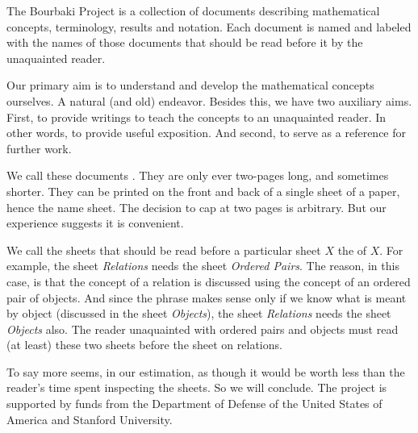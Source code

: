 
\sbasic

\sstart
{}

The Bourbaki Project is a collection
of documents describing mathematical
concepts, terminology, results and
notation. Each document is named and
labeled with the names of those documents
that should be read before it by the
unaquainted reader.

Our primary aim is to understand and
develop the mathematical concepts ourselves.
A natural (and old) endeavor.
Besides this, we have two auxiliary aims.
First, to provide writings to teach
the concepts to an unaquainted reader. In other
words, to provide useful exposition.
And second, to serve as a reference for
further work.

We call these documents .
They are only ever two-pages long, and
sometimes shorter.
They can be printed on the front
and back of a single
sheet of a paper, hence the name sheet.
The decision to cap at two pages is
arbitrary.
But our
experience suggests it is convenient.

We call the sheets that should
be read before a particular sheet
$X$ the  of $X$.
For example, the sheet \textit{Relations}
needs the sheet \textit{Ordered Pairs}.
The reason, in this case, is that the
concept of a relation is discussed using
the concept of an ordered pair of objects.
And since the phrase
 makes sense
only if we know what is meant by object
(discussed in the sheet \textit{Objects}),
the sheet \textit{Relations} needs the sheet
\textit{Objects} also.
The reader unaquainted with
ordered pairs and
objects must read (at least) these two
sheets before the sheet on relations.



%
%


To say more seems, in our
estimation, as though it would be
worth less than the reader's
time spent inspecting the sheets.
So we will conclude.
The project is supported by
funds from the Department of
Defense of the United States of America
and Stanford University.
\strats
